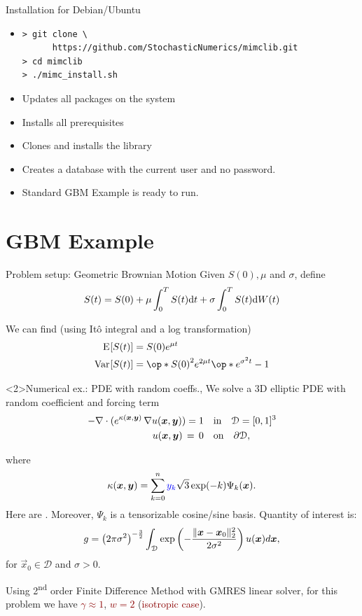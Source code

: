 \begin{frame}[fragile]{Installation for Debian/Ubuntu}
\begin{itemize}
  \item
\begin{verbatim}
> git clone \
      https://github.com/StochasticNumerics/mimclib.git
> cd mimclib
> ./mimc_install.sh
\end{verbatim}
  \item Updates all packages on the system
  \item Installs all prerequisites
  \item Clones and installs the library
  \item Creates a database with the current user and no password.
  \item Standard GBM Example is ready to run.
\end{itemize}
\end{frame}


\section{GBM Example}
\begin{frame}{Problem setup: Geometric Brownian Motion}
Given $S(0), \mu$ and $\sigma$, define
  \[
    S(t) = S(0) + \mu \int_{0}^T S(t) { \mathrm{d} }{t} + \sigma \int_{0}^T S(t) { \mathrm{d} }{W}(t)
\]

We can find (using It\^o integral and a log transformation)
\[\aligned
\E{S(t)} &= S(0) e^{\mu t}\\
\var{S(t)} &= \op*{S(0)}^2 e^{2 \mu t} \op*{e^{\sigma^2 t} - 1}
\endaligned\]
\end{frame}

\begin{frame}<2>{Numerical ex.: PDE with random coeffs.,
    \myref{\tiny [H-ANTT, 2015]}}
   \fontsize{9pt}{7.2}\selectfont
   We solve a 3D elliptic PDE with random coefficient and forcing term
\[ \aligned
    - \nabla \cdot(e^{\kappa(\vec x,\vec y)}\,\nabla u(\vec x,\vec y)) = 1 &\quad \mbox{in}\quad \mathcal{D} = [0,1]^3  \\
    u(\vec x,\vec y) \,=\, 0 								& \quad
    \mbox{on}\quad \partial \mathcal{D},
\endaligned
\]

where
\[ \kappa({{\boldsymbol x}}, {{\boldsymbol y}}) = {\sum_{k=0}^{n} {{\color{blue} y_{k}}} \sqrt{3}\exp(-k) \Psi_{k}({{\boldsymbol x}}) }.
\]
Here  are
. Moreover, $\Psi_{k}$ is a
tensorizable cosine/sine basis. Quantity of interest is:
\[g = \left( 2 \pi \sigma^2 \right)^{-\frac{3}{2}} \int_\mathcal{D} \exp
\left( - \frac{ \| {{\boldsymbol x}} - {{\boldsymbol x}}_0 \|^2_2}{2 \sigma^2} \right)
u({{\boldsymbol x}}) d{{\boldsymbol x}}, \]
for $\vec x_0 \in \mathcal D$ and $\sigma >0$.

\pause \medskip Using 2\textsuperscript{nd} order Finite Difference Method with GMRES
linear solver, for this problem we have
\textcolor{darkred}{$\gamma \approx 1$}, \textcolor{darkred}{$w = 2$}
(\textcolor{darkred}{isotropic case}).
\end{frame}

